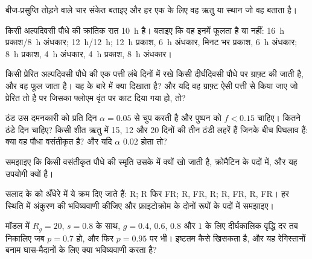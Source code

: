 \begin{exercise}[$\star$]\label{exo:b2:plant-flowering:4}
बीज-प्रसुप्ति तोड़ने वाले चार संकेत बताइए और हर एक के लिए वह ऋतु
या स्थान जो वह बताता है।
\end{exercise}

\begin{exercise}[$\star\star$]\label{exo:b2:plant-flowering:5}
किसी अल्पदिवसी पौधे की क्रांतिक रात \qty{10}{h} है। बताइए कि वह इनमें
फूलता है या नहीं: \qty{16}{h} प्रकाश/\qty{8}{h} अंधकार; \qty{12}{h}/\qty{12}{h};
\qty{12}{h} प्रकाश, \qty{6}{h} अंधकार, मिनट भर प्रकाश, \qty{6}{h} अंधकार;
\qty{8}{h} प्रकाश, \qty{4}{h} अंधकार, \qty{4}{h} प्रकाश, \qty{8}{h} अंधकार।
\end{exercise}

\begin{exercise}[$\star\star$]\label{exo:b2:plant-flowering:6}
किसी प्रेरित अल्पदिवसी पौधे की एक पत्ती लंबे दिनों में रखे किसी
दीर्घदिवसी पौधे पर ग्राफ़्ट की जाती है, और वह  फूल जाता
है। यह  के बारे में क्या दिखाता है? और यदि वह ग्राफ़्ट ऐसी
पत्ती से किया जाए जो प्रेरित तो है पर जिसका फ्लोएम वृंत पर काट दिया गया
हो, तो?
\end{exercise}

\begin{exercise}[$\star\star$]\label{exo:b2:plant-flowering:7}
ठंड उस दमनकारी को प्रति दिन $\alpha = 0.05$ से चुप करती है और
पुष्पन को $f < 0.15$ चाहिए। कितने ठंडे दिन चाहिए? किसी
शीत ऋतु में 15, 12 और 20 दिनों की तीन ठंडी लहरें हैं जिनके बीच
पिघलाव हैं: क्या वह पौधा वसंतीकृत है? और यदि $\alpha$ $0.02$ होता तो?
\end{exercise}

\begin{exercise}[$\star\star$]\label{exo:b2:plant-flowering:8}
समझाइए कि किसी वसंतीकृत पौधे की स्मृति उसके  में क्यों खो जाती है,
क्रोमैटिन के पदों में, और यह उपयोगी क्यों है।
\end{exercise}

\begin{exercise}[$\star\star$]\label{exo:b2:plant-flowering:9}
सलाद के  को अँधेरे में ये क्रम दिए जाते हैं: R; R फिर FR;
R, FR, R; R, FR, R, FR। हर स्थिति में अंकुरण की भविष्यवाणी कीजिए और
फ़ाइटोक्रोम के दोनों रूपों के पदों में समझाइए।
\end{exercise}

\begin{exercise}[$\star\star\star$]\label{exo:b2:plant-flowering:10}
 मॉडल में $R_g = 20$, $s = 0.8$ के साथ,
$g = 0.4$, $0.6$, $0.8$ और $1$ के लिए दीर्घकालिक वृद्धि दर तब निकालिए
जब $p = 0.7$ हो, और फिर $p = 0.95$ पर भी। इष्टतम कैसे खिसकता है,
और यह रेगिस्तानों बनाम घास-मैदानों के लिए क्या भविष्यवाणी करता है?
\end{exercise}

